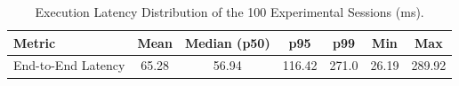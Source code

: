\begin{table}[!htbp]
\renewcommand{\arraystretch}{1.05}
\centering
\small
\caption{Execution Latency Distribution of the 100 Experimental Sessions (ms).}
\label{tab:session_latency}
\vspace{4pt}
\begin{tabular}{l c c c c c c}
\hline
Metric & Mean & Median (p50) & p95 & p99 & Min & Max \\
\hline
End-to-End Latency & 65.28 & 56.94 & 116.42 & 271.0 & 26.19 & 289.92 \\
\hline
\end{tabular}
\end{table}
